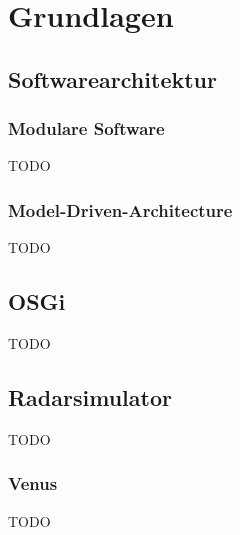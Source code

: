 \chapter{Grundlagen}
\section{Softwarearchitektur}
\subsection{Modulare Software}
TODO
\subsection{Model-Driven-Architecture}
TODO
\section{OSGi}
TODO
\section{Radarsimulator}
TODO
\subsection{Venus}
TODO